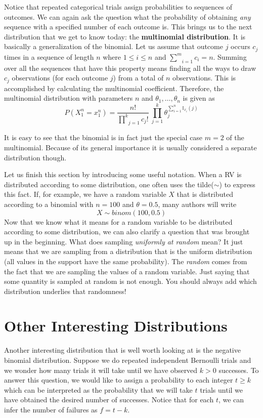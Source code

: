 Notice that repeated categorical trials assign probabilities to sequences of outcomes. We can again ask the question what the
probability of obtaining \textit{any} sequence with a specified number of each outcome is. This brings us to the next distribution that we get to know today: the \textbf{multinomial distribution}. It is basically a generalization
of the binomial. Let us assume that outcome $ j $ occurs $ c_{j} $ times in a sequence of length $ n $ where
$ 1 \leq i \leq n $ and $ \underset{i=1}{\overset{m}{\sum}}c_{i} = n $. Summing over all the sequences that have this property means finding all the ways
to draw $ c_{j} $ observations (for each outcome $ j $) from a total of $ n $ observations. This is accomplished by calculating the multinomial coefficient. 
Therefore, the multinomial distribution with parameters $ n $ and 
$ \theta_{1}, \ldots, \theta_{n} $ is given as 
\begin{equation}
P(X_{1}^{n} = x_{1}^{n}) = \dfrac{n!}{\underset{j=1}{\overset{k}{\prod}}c_{j}!}~\underset{j=1}{\overset{k}{\prod}} \theta_{j}^{\sum_{i=1}^{n}\mathbb{I}_{x_{i}}(j)}
\end{equation}

It is easy to see that the binomial is in fact just the special case
$m=2$ of the multinomial. Because of its general importance it is usually
considered a separate distribution though.

Let us finish this section by introducing some useful notation. When a RV is distributed according to some distribution, one often uses
the tilde($\sim$) to express this fact. If, for example, we have a random variable $ X $ that is distributed according to a binomial with $ n=100 $
and $ \theta = 0.5 $, many authors will write
$$ X \sim binom(100, 0.5) $$
Now that we know what it means for a random variable to be distributed according to some distribution, we can also clarify a question 
that was brought up in the beginning. What does sampling \textit{uniformly at random} mean? It just means that we are sampling from
a distribution that is the uniform distribution (all values in the support have the same probability). The \textit{random} comes from the fact that
we are sampling the values of a random variable. Just saying that some quantity is sampled at random is not enough. You should
always add which distribution underlies that randomness!


\section{Other Interesting Distributions}
Another interesting distribution that is well worth looking at is the negative binomial distribution. Suppose we do repeated independent Bernoulli trials and we wonder
how many trials it will take until we have observed $ k > 0 $ successes. To answer this question, we would like to assign a probability to each integer $ t \geq k $ which 
can be interpreted as the probability that we will take $ t $ trials until we have obtained the desired number of successes. Notice that for each $ t $, we can infer
the number of failures as $ f = t - k $.

